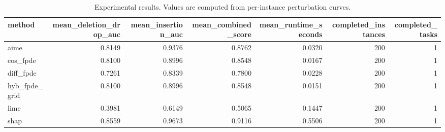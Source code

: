 \begin{table}[t]
\caption{Experimental results. Values are computed from per-instance perturbation curves.}
\label{tab:main_results_computed}
\centering
\begin{tabular}{lrrrrrr}
\toprule
method & mean\_deletion\_drop\_auc & mean\_insertion\_auc & mean\_combined\_score & mean\_runtime\_seconds & completed\_instances & completed\_tasks \\
\midrule
aime & 0.8149 & 0.9376 & 0.8762 & 0.0320 & 200 & 1 \\
cos\_fpde & 0.8100 & 0.8996 & 0.8548 & 0.0167 & 200 & 1 \\
diff\_fpde & 0.7261 & 0.8339 & 0.7800 & 0.0228 & 200 & 1 \\
hyb\_fpde\_grid & 0.8100 & 0.8996 & 0.8548 & 0.0151 & 200 & 1 \\
lime & 0.3981 & 0.6149 & 0.5065 & 0.1447 & 200 & 1 \\
shap & 0.8559 & 0.9673 & 0.9116 & 0.5506 & 200 & 1 \\
\bottomrule
\end{tabular}

\end{table}
